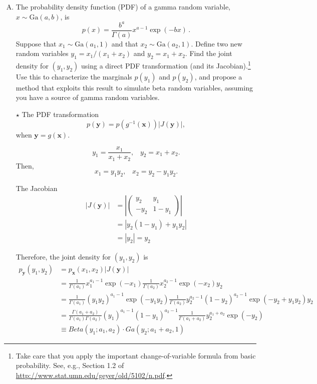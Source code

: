 \documentclass[11pt]{article}
\newcommand{\jie}{$\star$ }
\newcommand{\by}{\bm{y}}
\newcommand{\bx}{\bm{x}}
\begin{document}
\begin{enumerate}[(A)]
\bigskip

\item The probability density function (PDF) of a gamma random variable, $x \sim
\mbox{Ga}(a,b)$, is
$$
p(x) = \frac{b^a}{\Gamma(a)} x^{a-1} \exp(-bx) \, .
$$
Suppose that $x_1 \sim \mbox{Ga}(a_1,1)$ and that $x_2 \sim \mbox{Ga}(a_2,1)$.  Define two new random variables $y_1 = x_1/(x_1 + x_2)$ and $y_2 = x_1 + x_2$.  Find the joint density for $(y_1, y_2)$ using a direct PDF transformation (and its Jacobian).\footnote{Take care that you apply the important change-of-variable formula from basic probability.  See, e.g., Section 1.2 of \url{http://www.stat.umn.edu/geyer/old/5102/n.pdf}.}  Use this to characterize the  marginals $p(y_1)$ and $p(y_2)$, and propose a method that exploits this result to simulate beta random variables, assuming you have a source of gamma random variables.

\bigskip

\jie The PDF transformation
$$p(\by) = p(g^{-1}(\bx)) \left| J(\by) \right|,$$
when $\by = g(\bx)$.

$$ y_1 = \frac{x_1}{x_1+x_2}, \;\;\; y_2 = x_1 + x_2.$$
Then,
$$ x_1 = y_1y_2, \;\;\; x_2 = y_2 - y_1y_2.$$

The Jacobian
\begin{align*}
    \left| J(\by) \right| &= \left| \left( \begin{array}{cc} y_2 & y_1 \\
    -y_2 & 1-y_1 \end{array} \right) \right| \\
    &= \left| y_2(1-y_1) + y_1 y_2 \right| \\
    &= |y_2| = y_2
\end{align*}

Therefore, the joint density for $(y_1, y_2)$ is 
\begin{align*}
    p_{\by}(y_1,y_2) &= p_{\bx}(x_1,x_2) \left|J(\by) \right| \\
    &= \frac{1}{\Gamma(a_1)} x_1^{a_1-1} \exp (-x_1) \frac{1}{\Gamma(a_2)} x_2^{a_2-1} \exp (-x_2) y_2 \\
    &= \frac{1}{\Gamma(a_1)} (y_1y_2)^{a_1-1} \exp (-y_1y_2) \frac{1}{\Gamma(a_2)} y_2^{a_2-1} (1-y_2)^{a_2-1} \exp (-y_2+y_1y_2) y_2 \\
    &= \frac{\Gamma(a_1+a_2)}{\Gamma(a_1)\Gamma(a_2)} (y_1)^{a_1-1} (1-y_1)^{a_2-1} \frac{1}{\Gamma(a_1+a_2)} y_2^{a_1+a_2} \exp (-y_2)  \\
    &\equiv Beta(y_1;a_1,a_2) \cdot Ga(y_2;a_1+a_2,1)
\end{align*}


\end{enumerate}
\end{document}
